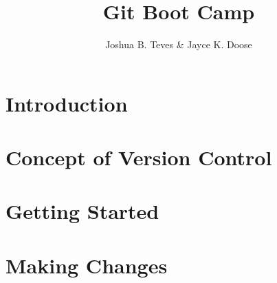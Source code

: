 \documentclass[10pt]{book}
\title{Git Boot Camp}
\author{Joshua B. Teves \& Jayce K. Doose}
\begin{document}
\maketitle

\tableofcontents

\chapter*{Introduction}


\chapter{Concept of Version Control}


\chapter{Getting Started}


\chapter{Making Changes}

\end{document}
